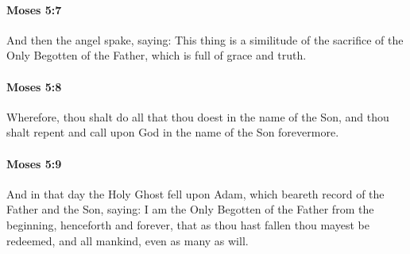 		\paragraph{Moses 5:7} %
			\label{MOSES-5-7}

			And then the angel spake, saying: This thing is a similitude of the sacrifice of the Only Begotten of the Father, which is full of grace and truth.


		\paragraph{Moses 5:8} %
			\label{MOSES-5-8}

			Wherefore, thou shalt do all that thou doest in the name of the Son, and thou shalt repent and call upon God in the name of the Son forevermore.


		\paragraph{Moses 5:9} %
			\label{MOSES-5-9}

			And in that day the Holy Ghost fell upon Adam, which beareth record of the Father and the Son, saying: I am the Only Begotten of the Father from the beginning, henceforth and forever, that as thou hast fallen thou mayest be redeemed, and all mankind, even as many as will.


